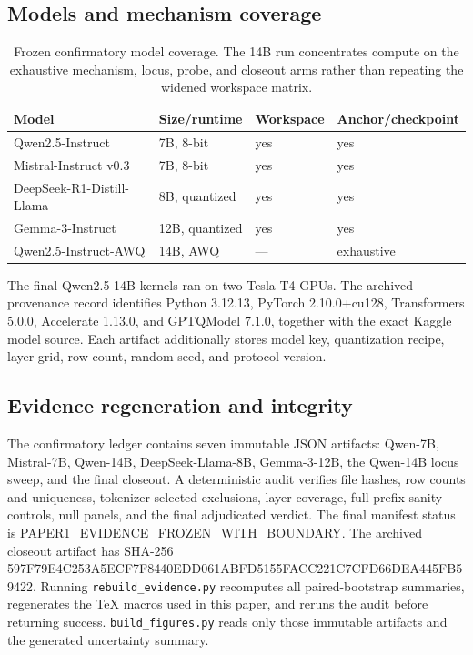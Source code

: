 \documentclass[10pt]{article}
\begin{document}
\subsection{Models and mechanism coverage}

\begin{table}[H]
\centering
\small
\begin{tabular}{llll}
\toprule
Model & Size/runtime & Workspace & Anchor/checkpoint \\
\midrule
Qwen2.5-Instruct & 7B, 8-bit & yes & yes \\
Mistral-Instruct v0.3 & 7B, 8-bit & yes & yes \\
DeepSeek-R1-Distill-Llama & 8B, quantized & yes & yes \\
Gemma-3-Instruct & 12B, quantized & yes & yes \\
Qwen2.5-Instruct-AWQ & 14B, AWQ & --- & exhaustive \\
\bottomrule
\end{tabular}
\caption{Frozen confirmatory model coverage. The 14B run concentrates compute
on the exhaustive mechanism, locus, probe, and closeout arms rather than
repeating the widened workspace matrix.}
\label{tab:model-coverage}
\end{table}

The final Qwen2.5-14B kernels ran on two Tesla T4 GPUs. The archived provenance
record identifies Python 3.12.13, PyTorch 2.10.0+cu128, Transformers 5.0.0,
Accelerate 1.13.0, and GPTQModel 7.1.0, together with the exact Kaggle model
source. Each artifact additionally stores model key, quantization recipe,
layer grid, row count, random seed, and protocol version.

\subsection{Evidence regeneration and integrity}

The confirmatory ledger contains seven immutable JSON artifacts: Qwen-7B,
Mistral-7B, Qwen-14B, DeepSeek-Llama-8B, Gemma-3-12B, the Qwen-14B locus sweep,
and the final closeout. A deterministic audit verifies file hashes, row counts
and uniqueness, tokenizer-selected exclusions, layer coverage, full-prefix
sanity controls, null panels, and the final adjudicated verdict. The final
manifest status is
{\small\ttfamily PAPER1\_EVIDENCE\_FROZEN\_WITH\_BOUNDARY}. The archived closeout
artifact has SHA-256
{\footnotesize\ttfamily 597F79E4C253A5ECF7F8440EDD061ABFD5155FACC221C7CFD66DEA445FB59422}.
Running \texttt{rebuild\_evidence.py} recomputes all paired-bootstrap summaries,
regenerates the TeX macros used in this paper, and reruns the audit before
returning success. \texttt{build\_figures.py} reads only those immutable
artifacts and the generated uncertainty summary.
\end{document}
